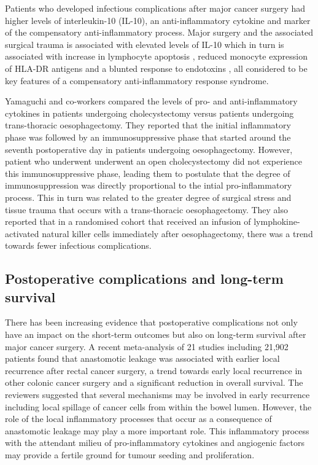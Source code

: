 Patients who developed infectious complications after major cancer surgery had higher levels of interleukin-10 (IL-10), an anti-inflammatory cytokine and marker of the compensatory anti-inflammatory process.\parencite{mokart_early_2002} Major surgery and the associated surgical trauma is associated with elevated levels of IL-10 which in turn is associated with increase in lymphocyte apoptosis \parencite{delogu_interleukin-10_2001}, reduced monocyte expression of HLA-DR antigens \parencite{klava_interleukin-10._1997} and a blunted response to endotoxins \parencite{ogata_role_2000, kawasaki_surgical_2001}, all considered to be key features of a compensatory anti-inflammatory response syndrome. 

Yamaguchi and co-workers compared the levels of pro- and anti-inflammatory cytokines in patients undergoing cholecystectomy versus patients undergoing trans-thoracic oesophagectomy. They reported that the initial inflammatory phase was followed by an immunosuppressive phase that started around the seventh postoperative day in patients undergoing oesophagectomy. However, patient who underwent underwent an open cholecystectomy did not experience this immunosuppressive phase, leading them to postulate that the degree of immunosuppression was directly proportional to the intial pro-inflammatory process. This in turn was related to the greater degree of surgical stress and tissue trauma that occurs with a trans-thoracic oesophagectomy. They also reported that in a randomised cohort that received an infusion of lymphokine-activated natural killer cells immediately after oesophagectomy, there was a trend towards fewer infectious complications.\parencite{yamaguchi_postoperative_2006}

\subsection{Postoperative complications and long-term survival}
There has been increasing evidence that postoperative complications not only have an impact on the short-term outcomes but also on long-term survival after major cancer surgery. A recent meta-analysis of 21 studies including 21,902 patients found that anastomotic leakage was associated with earlier local recurrence after rectal cancer surgery, a trend towards early local recurrence in other colonic cancer surgery and a significant reduction in overall survival.\parencite{mirnezami_increased_2011} The reviewers suggested that several mechanisms may be involved in early recurrence including local spillage of cancer cells from within the bowel lumen. However, the role of the local inflammatory processes that occur as a consequence of anastomotic leakage may play a more important role. This inflammatory process with the attendant milieu of pro-inflammatory cytokines and angiogenic factors may provide a fertile ground for tumour seeding and proliferation.

